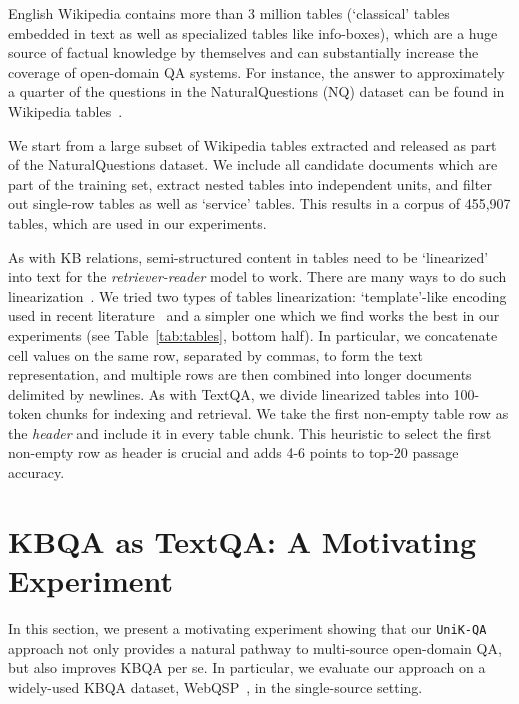 \documentclass[11pt]{article}
\newcommand{\uniqa}{\texttt{UniK-QA}\xspace}
\begin{document}
English Wikipedia contains more than 3 million tables (`classical' tables embedded in text as well as specialized tables like info-boxes), which are a huge source of factual knowledge by themselves and can substantially increase the coverage of open-domain QA systems.  
For instance, the answer to approximately a quarter of the questions in the NaturalQuestions (NQ) dataset can be found in Wikipedia tables~\cite{NQ}.

We start from a large subset of Wikipedia tables extracted and released as part of the NaturalQuestions dataset.  We include all candidate documents which are part of the training set, extract nested tables into independent units, and filter out single-row tables as well as `service' tables.  This results in a corpus of 455,907 tables, which are used in our experiments.

As with KB relations, semi-structured content in tables need to be `linearized' into text for the \emph{retriever-reader} model to work.  There are many ways to do such linearization~\citep[see][]{yin2020tabert,chen2019tabfact}.
We tried two types of tables linearization: `template'-like encoding used in recent literature~\cite{chen2019tabfact} and a simpler one which we find works the best in our experiments (see Table~\ref{tab:tables}, bottom half).
In particular, we concatenate cell values on the same row, separated by commas, to form the text representation, and multiple rows are then combined into longer documents delimited by newlines.
As with TextQA, we divide linearized tables into 100-token chunks for indexing and retrieval.  We take the first non-empty table row as the \emph{header} and include it in every table chunk.  This heuristic to select the first non-empty row as header is crucial and adds 4-6 points to top-20 passage accuracy. 

 
\section{KBQA as TextQA: A Motivating Experiment}\label{sec:exp:kbqa_as_textqa}

In this section, we present a motivating experiment showing that our \uniqa{} approach not only provides a natural pathway to multi-source open-domain QA, but also improves KBQA per se.
In particular, we evaluate our approach on a widely-used KBQA dataset, WebQSP~\cite{yih2016the}, in the single-source setting.
\end{document}
